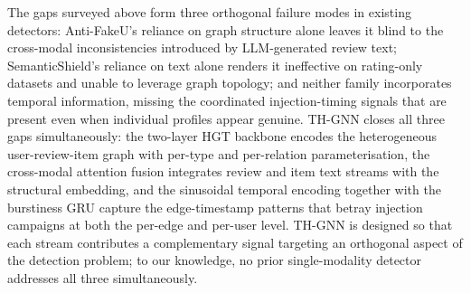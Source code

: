 
The gaps surveyed above form three orthogonal failure modes in existing
detectors: Anti-FakeU's reliance on graph structure alone leaves it blind to
the cross-modal inconsistencies introduced by LLM-generated review text;
SemanticShield's reliance on text alone renders it ineffective on rating-only
datasets and unable to leverage graph topology; and neither family incorporates
temporal information, missing the coordinated injection-timing signals that are
present even when individual profiles appear genuine.
TH-GNN closes all three gaps simultaneously: the two-layer HGT backbone encodes
the heterogeneous user-review-item graph with per-type and per-relation
parameterisation, the cross-modal attention fusion integrates review and item
text streams with the structural embedding, and the sinusoidal temporal
encoding together with the burstiness GRU capture the edge-timestamp patterns
that betray injection campaigns at both the per-edge and per-user level.
TH-GNN is designed so that each stream contributes a complementary
signal targeting an orthogonal aspect of the detection problem; to our
knowledge, no prior single-modality detector addresses all three
simultaneously.
